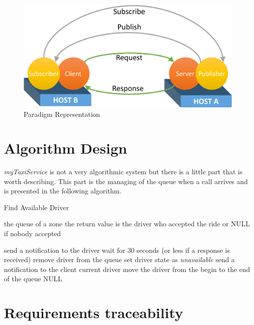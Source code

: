 \documentclass[a4paper]{article}
\begin{document}
\begin{figure}[H]
\includegraphics[width=.65\textwidth]{Paradigm}
\centering
\caption{Paradigm Representation}
\label{fig:paradigm}
\end{figure}

\section{Algorithm Design}

\emph{myTaxiService} is not a very algorithmic system but there is a little part that is worth describing.
This part is the managing of the queue when a call arrives and is presented in the following algorithm.

\begin{center}
\begin{minipage}{.8\textwidth}
\begin{algorithm}[H]
\caption{Find Available Driver}
\label{alg:findavailabledriver}
\begin{algorithmic}
    
    \REQUIRE the queue of a zone
    \ENSURE the return value is the driver who accepted the ride or NULL if nobody accepted
    
        \STATE send a notification to the driver
        \STATE wait for 30 seconds (or less if a response is received)
            \STATE remove driver from the queue
            \STATE set driver state as \emph{unavailable}
            \STATE send a notification to the client
            \RETURN current driver
            \STATE move the driver from the begin to the end of the queue
        \ENDIF
    \ENDFOR
    \RETURN NULL
\end{algorithmic}
\end{algorithm}
\end{minipage}
\end{center}


\section{Requirements traceability}
\end{document}
